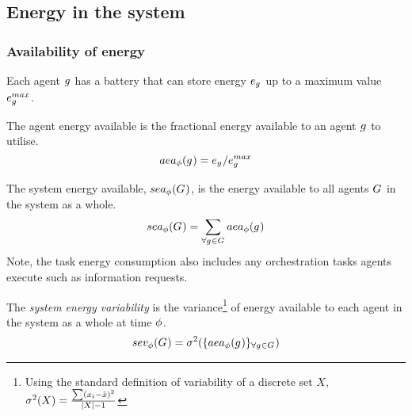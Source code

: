 
\subsection{Energy in the system}
\subsubsection{Availability of energy}

Each agent $g_{}^{}$ has a battery that can store energy $\varBatteryEnergy{}{}$ up to a maximum value $\varBatteryEnergyMax{}{}$.

\begin{definition}
	The agent energy available is the fractional energy available to an agent $g_{}^{}$ to utilise.
	\begin{equation}
		\functionAgentEnergyAvailable{}{} = \varBatteryEnergy{}{} / \varBatteryEnergyMax{}{}
	\end{equation}
\end{definition}

\begin{definition}
	The system energy available, $\functionSystemEnergyAvailable{}{}$, is the energy available to all agents $G_{}^{}$ in the system as a whole.
	\begin{equation}
		\functionSystemEnergyAvailable{}{} 
		= \sum_{\forall \varAgent{}{} \in \setAgents{}{}} \functionAgentEnergyAvailable{\varAgent{i}{}}{}
	\end{equation}
	Note, the task energy consumption also includes any orchestration tasks agents execute such as information requests.
\end{definition}
	
\begin{definition}
	The \textit{system energy variability} is the variance\footnote{Using the standard definition of variability of a discrete set $X$, $\sigma^2(X) = \frac{\sum (x_i - \bar{x})^2}{\lvert X \rvert-1}$} of energy available to each agent in the system as a whole at time $\phi$.
	\begin{equation}     	
		\functionSystemEnergyVariability{}{} 
		= \sigma^2(
			\lbrace \functionAgentEnergyAvailable{}{}
			\rbrace_{\forall \varAgent{}{} \in \setAgents{}{}}
		)
	\end{equation}
\end{definition}

